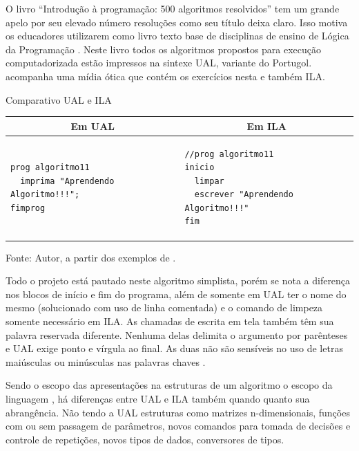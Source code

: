 O livro ``Introdução à programação: 500 algoritmos resolvidos'' tem um grande apelo por seu elevado número resoluções como seu título deixa claro. Isso motiva os educadores utilizarem como livro texto base de disciplinas de ensino de Lógica da Programação \cite{citar}. Neste livro todos os algoritmos propostos para execução computadorizada estão impressos na sintexe UAL, variante do Portugol. acompanha uma mídia ótica que contém os exercícios nesta e também ILA.

\begin{quadro}[h]
\centering
  \caption{Comparativo UAL e ILA}\label{qua:compare-ualila}
\begin{tabular}{| p{75mm} | p{75mm} |}\hline
\multicolumn{1}{|c|}{\textbf{Em UAL}} & \multicolumn{1}{|c|}{\textbf{Em ILA}} \\ \hline
\begin{lstlisting}[language=ual,style=table]
prog algoritmo11
  imprima "Aprendendo Algoritmo!!!";
fimprog
\end{lstlisting} &
\begin{lstlisting}[language=ila,style=table]
//prog algoritmo11
inicio
  limpar
  escrever "Aprendendo Algoritmo!!!"
fim
\end{lstlisting} \\ \hline
\end{tabular}
  \caption*{\ifdraft{\color{green}}{}\footnotesize Fonte: Autor, a partir dos exemplos de .}
\end{quadro}

Todo o projeto está pautado neste algoritmo simplista, porém se nota a diferença nos blocos de início e fim do programa, além de somente em UAL ter o nome do mesmo (solucionado com uso de linha comentada) e o comando de limpeza somente necessário em ILA. As chamadas de escrita em tela também têm sua palavra reservada diferente. Nenhuma delas delimita o argumento por parênteses e UAL exige ponto e vírgula ao final. As duas não são sensíveis no uso de letras maiúsculas ou minúsculas nas palavras chaves \cite{citar}.

Sendo o escopo das apresentações na estruturas de um algoritmo o escopo da linguagem \cite[p.~22]{spallanzani2000etal}, há diferenças entre UAL e ILA também quando quanto sua abrangência. Não tendo a UAL estruturas como matrizes n-dimensionais, funções com ou sem passagem de parâmetros, novos comandos para tomada de decisões e controle de repetições, novos tipos de dados, conversores de tipos.

